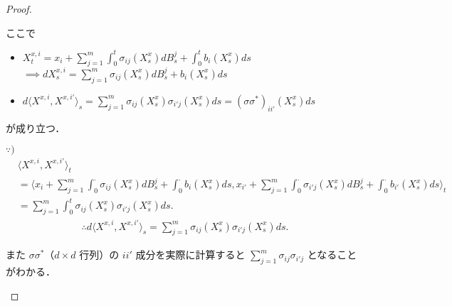 \documentclass{jsarticle}
\begin{document}
\begin{proof}
\begin{enumerate}[label=(\arabic*)]
        ここで
        \begin{itemize}
            \item 
            $\displaystyle X_{t}^{x, i}
            = x_i
            + \sum_{j=1}^{m}\int_{0}^{t}\sigma_{ij}(X_{s}^{x})dB_{s}^{j}
            + \int_{0}^{t}b_{i}(X_{s}^{x})ds$ \\
            $\displaystyle \implies dX_{s}^{x, i}
            = \sum_{j=1}^{m}\sigma_{ij}(X_{s}^{x})dB_{s}^{j}
            + b_{i}(X_{s}^{x})ds$
            \item 
            $\displaystyle d\langle X^{x, i}, X^{x, i'}\rangle_{s}
            = \sum_{j=1}^{m}\sigma_{ij}(X_{s}^{x})\sigma_{i'j}(X_{s}^{x})ds
            = (\sigma\sigma^{\ast})_{ii'}(X_{s}^{x})ds$
        \end{itemize}
        が成り立つ．

        \begin{screen}
            $\because)$
            \begin{align}
                &\langle X^{x, i}, X^{x, i'}\rangle_{t} \\
                &= \langle x_i
                + \sum_{j=1}^{m}\int_{0}^{\cdot}\sigma_{ij}(X_{s}^{x})dB_{s}^{j}
                + \int_{0}^{\cdot}b_{i}(X_{s}^{x})ds, 
                x_{i'}
                + \sum_{j=1}^{m}\int_{0}^{\cdot}\sigma_{i'j}(X_{s}^{x})dB_{s}^{j}
                + \int_{0}^{\cdot}b_{i'}(X_{s}^{x})ds\rangle_{t} \\
                &= \sum_{j=1}^{m}\int_{0}^{t}\sigma_{ij}(X_{s}^{x})\sigma_{i'j}(X_{s}^{x})ds.
            \end{align}
            \begin{align}
                \therefore d\langle X^{x, i}, X^{x, i'}\rangle_{s}
                = \sum_{j=1}^{m}\sigma_{ij}(X_{s}^{x})\sigma_{i'j}(X_{s}^{x})ds.
            \end{align}

            また $\sigma\sigma^{\ast}$（$d\times d$ 行列）の $ii'$ 成分を実際に計算すると $\sum_{j=1}^{m}\sigma_{ij}\sigma_{i'j}$ となることがわかる．
        \end{screen}
        

\end{enumerate}
\end{proof}
\end{document}
